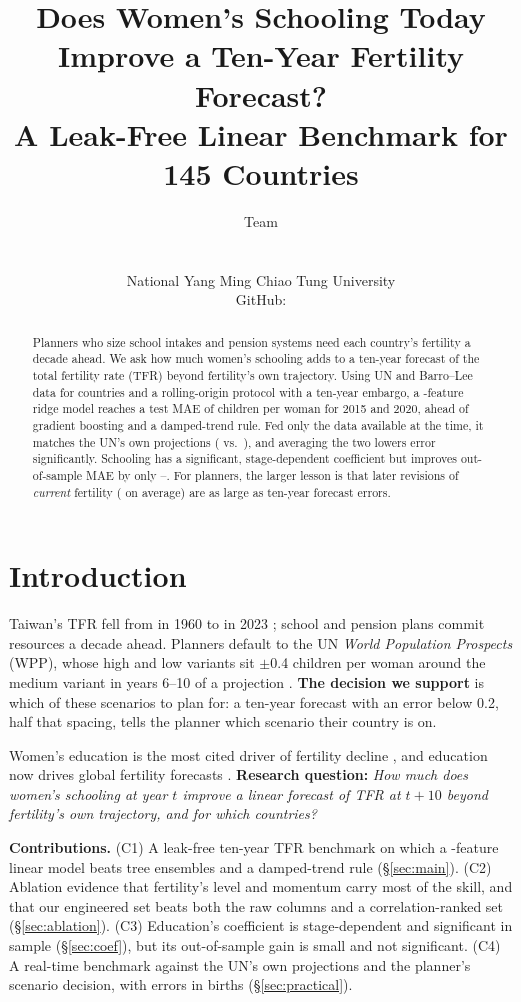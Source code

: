 \documentclass[11pt]{article}
\title{Does Women's Schooling Today Improve a Ten-Year Fertility Forecast?\\A Leak-Free Linear Benchmark for 145 Countries}
\author{Team \teamid{} \\
  \zh{李尚哲} \quad \zh{呂丞頤} \quad \zh{黃駿甯} \quad \zh{吳美真} \\
  \zh{孫傅康} \quad \zh{傅維雨} \quad \zh{張凱華} \quad \zh{李玠廷} \\
  National Yang Ming Chiao Tung University \\
  GitHub: \repourl}
\begin{document}
\maketitle

\begin{abstract}
Planners who size school intakes and pension systems need each country's fertility a decade ahead. We ask how much women's schooling adds to a ten-year forecast of the total fertility rate (TFR) beyond fertility's own trajectory. Using UN and Barro--Lee data for \nCountries{} countries and a rolling-origin protocol with a ten-year embargo, a \nFeatures{}-feature ridge model reaches a test MAE of \teMaeOurs{} children per woman for 2015 and 2020, ahead of gradient boosting and a damped-trend rule. Fed only the data available at the time, it matches the UN's own projections (\unMaeRt{} vs.\ \unMaeUn), and averaging the two lowers error significantly. Schooling has a significant, stage-dependent coefficient but improves out-of-sample MAE by only \eduGainLo--\eduGainHi. For planners, the larger lesson is that later revisions of \emph{current} fertility (\revAll{} on average) are as large as ten-year forecast errors.
\end{abstract}

\section{Introduction}
Taiwan's TFR fell from \twnSixty{} in 1960 to \twnTwentyThree{} in 2023 \citep{un2024wpp}; school and pension plans commit resources a decade ahead. Planners default to the UN \emph{World Population Prospects} (WPP), whose high and low variants sit $\pm$0.4 children per woman around the medium variant in years 6--10 of a projection \citep{un2024methodology}. \textbf{The decision we support} is which of these scenarios to plan for: a ten-year forecast with an error below 0.2, half that spacing, tells the planner which scenario their country is on.

Women's education is the most cited driver of fertility decline \citep{lutz2011global,bongaarts2003completing}, and education now drives global fertility forecasts \citep{vollset2020fertility}. \textbf{Research question:} \emph{How much does women's schooling at year $t$ improve a linear forecast of TFR at $t{+}10$ beyond fertility's own trajectory, and for which countries?}

\textbf{Contributions.} (C1) A leak-free ten-year TFR benchmark on which a \nFeatures{}-feature linear model beats tree ensembles and a damped-trend rule (\S\ref{sec:main}). (C2) Ablation evidence that fertility's level and momentum carry most of the skill, and that our engineered set beats both the raw columns and a correlation-ranked set (\S\ref{sec:ablation}). (C3) Education's coefficient is stage-dependent and significant in sample (\S\ref{sec:coef}), but its out-of-sample gain is small and not significant. (C4) A real-time benchmark against the UN's own projections and the planner's scenario decision, with errors in births (\S\ref{sec:practical}).
\end{document}

